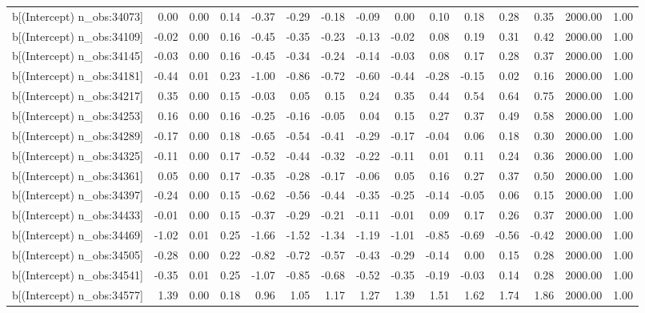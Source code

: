 \begin{table}[ht]
\begin{tabular}{rrrrrrrrrrrrrrr}
  b[(Intercept) n\_obs:34073] & 0.00 & 0.00 & 0.14 & -0.37 & -0.29 & -0.18 & -0.09 & 0.00 & 0.10 & 0.18 & 0.28 & 0.35 & 2000.00 & 1.00 \\ 
  b[(Intercept) n\_obs:34109] & -0.02 & 0.00 & 0.16 & -0.45 & -0.35 & -0.23 & -0.13 & -0.02 & 0.08 & 0.19 & 0.31 & 0.42 & 2000.00 & 1.00 \\ 
  b[(Intercept) n\_obs:34145] & -0.03 & 0.00 & 0.16 & -0.45 & -0.34 & -0.24 & -0.14 & -0.03 & 0.08 & 0.17 & 0.28 & 0.37 & 2000.00 & 1.00 \\ 
  b[(Intercept) n\_obs:34181] & -0.44 & 0.01 & 0.23 & -1.00 & -0.86 & -0.72 & -0.60 & -0.44 & -0.28 & -0.15 & 0.02 & 0.16 & 2000.00 & 1.00 \\ 
  b[(Intercept) n\_obs:34217] & 0.35 & 0.00 & 0.15 & -0.03 & 0.05 & 0.15 & 0.24 & 0.35 & 0.44 & 0.54 & 0.64 & 0.75 & 2000.00 & 1.00 \\ 
  b[(Intercept) n\_obs:34253] & 0.16 & 0.00 & 0.16 & -0.25 & -0.16 & -0.05 & 0.04 & 0.15 & 0.27 & 0.37 & 0.49 & 0.58 & 2000.00 & 1.00 \\ 
  b[(Intercept) n\_obs:34289] & -0.17 & 0.00 & 0.18 & -0.65 & -0.54 & -0.41 & -0.29 & -0.17 & -0.04 & 0.06 & 0.18 & 0.30 & 2000.00 & 1.00 \\ 
  b[(Intercept) n\_obs:34325] & -0.11 & 0.00 & 0.17 & -0.52 & -0.44 & -0.32 & -0.22 & -0.11 & 0.01 & 0.11 & 0.24 & 0.36 & 2000.00 & 1.00 \\ 
  b[(Intercept) n\_obs:34361] & 0.05 & 0.00 & 0.17 & -0.35 & -0.28 & -0.17 & -0.06 & 0.05 & 0.16 & 0.27 & 0.37 & 0.50 & 2000.00 & 1.00 \\ 
  b[(Intercept) n\_obs:34397] & -0.24 & 0.00 & 0.15 & -0.62 & -0.56 & -0.44 & -0.35 & -0.25 & -0.14 & -0.05 & 0.06 & 0.15 & 2000.00 & 1.00 \\ 
  b[(Intercept) n\_obs:34433] & -0.01 & 0.00 & 0.15 & -0.37 & -0.29 & -0.21 & -0.11 & -0.01 & 0.09 & 0.17 & 0.26 & 0.37 & 2000.00 & 1.00 \\ 
  b[(Intercept) n\_obs:34469] & -1.02 & 0.01 & 0.25 & -1.66 & -1.52 & -1.34 & -1.19 & -1.01 & -0.85 & -0.69 & -0.56 & -0.42 & 2000.00 & 1.00 \\ 
  b[(Intercept) n\_obs:34505] & -0.28 & 0.00 & 0.22 & -0.82 & -0.72 & -0.57 & -0.43 & -0.29 & -0.14 & 0.00 & 0.15 & 0.28 & 2000.00 & 1.00 \\ 
  b[(Intercept) n\_obs:34541] & -0.35 & 0.01 & 0.25 & -1.07 & -0.85 & -0.68 & -0.52 & -0.35 & -0.19 & -0.03 & 0.14 & 0.28 & 2000.00 & 1.00 \\ 
  b[(Intercept) n\_obs:34577] & 1.39 & 0.00 & 0.18 & 0.96 & 1.05 & 1.17 & 1.27 & 1.39 & 1.51 & 1.62 & 1.74 & 1.86 & 2000.00 & 1.00 \\ 

\end{tabular}
\end{table}
